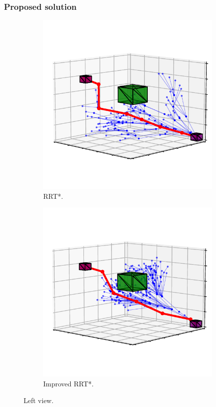\documentclass{beamer}
\begin{document}

\begin{frame}
	\frametitle{Proposed solution}	
	\begin{figure}[!ht]
		\centering 
		\begin{subfigure}[b]{0.45\textwidth}
			\includegraphics[width=\textwidth]{figChap4/6D_RRTstar1773it_loc_135to10.pdf}
			\caption{RRT*.} 
		\end{subfigure}  
		\begin{subfigure}[b]{0.45\textwidth}
			\includegraphics[width=\textwidth]{figChap4/6D_RRTstarML193it_loc_135to10.pdf}
			\caption{Improved RRT*.} 
		\end{subfigure}
		\caption{Left view.}
		 

\end{figure}
\end{frame}
\end{document}
